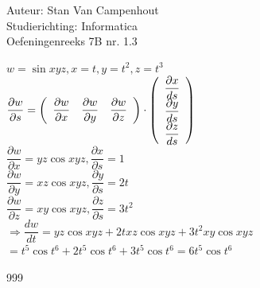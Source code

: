 \documentclass[a4paper]{article}
\begin{document}
  
\noindent \large Auteur: Stan Van Campenhout \\
\noindent \large Studierichting:  Informatica\\
\noindent \large Oefeningenreeks 7B nr. 1.3\\

\medskip

\normalsize

$ w = \sin xyz, x = t, y = t^2, z = t^3 $\\

$ \dfrac{\partial w}{\partial s} = \left(\begin{array}{c c c} \dfrac{\partial w}{\partial x} & \dfrac{\partial w}{\partial y} & \dfrac{\partial w}{\partial z} \end{array}\right) \cdot 
\left(\begin{array}{c} \dfrac{\partial x}{ds} \\ \dfrac{\partial y}{ds} \\ \dfrac{\partial z}{ds} \end{array}\right) $\\

$ \dfrac{\partial w}{\partial x} = yz\cos xyz, \dfrac{\partial x}{\partial s} = 1 $\\

$ \dfrac{\partial w}{\partial y} =  xz\cos xyz, \dfrac{\partial y}{\partial s} = 2t $\\

$ \dfrac{\partial w}{\partial z} =  xy\cos xyz, \dfrac{\partial z}{\partial s} = 3t^2 $\\

$ \Rightarrow  \dfrac{dw}{dt} = yz\cos xyz + 2txz\cos xyz + 3t^2xy\cos xyz $\\

$ = t^5\cos t^6 + 2t^5\cos t^6 + 3t^5\cos t^6 = 6t^5\cos t^6 $\\

\begin{thebibliography}{999}
\end{thebibliography}
\end{document}
